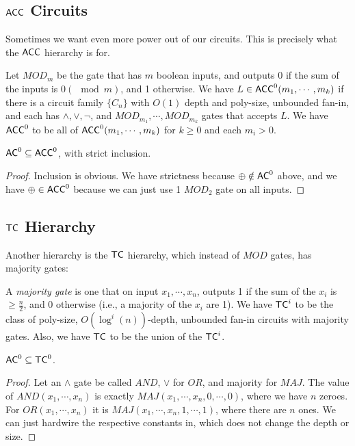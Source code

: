 \subsection{${\mathsf{ACC}}$ Circuits}
Sometimes we want even more power out of our circuits. This is precisely what the ${\mathsf{ACC}}$ hierarchy is for.
\begin{definition}
Let $MOD_m$ be the gate that has $m$ boolean inputs, and outputs 0 if the sum of the inputs is $0 (\mod m)$, and 1 otherwise. We have $L \in {\ensuremath{\mathsf{ACC}}}^0(m_1, \cdots, m_k)$ if there is a circuit family $\{C_n\}$ with $O(1)$ depth and poly-size, unbounded fan-in, and each has $\wedge, \vee, \neg$, and $MOD_{m_1}, \cdots, MOD_{m_k}$ gates that accepts $L$. We have ${\mathsf{ACC}}^0$ to be all of ${\mathsf{ACC}}^0(m_1, \cdots, m_k)$ for $k \ge 0$ and each $m_i > 0$. 
\end{definition}

\begin{theorem}
${\mathsf{AC}}^0 \subseteq {\ensuremath{\mathsf{ACC}}}^0$, with strict inclusion.
\end{theorem}

\begin{proof}
Inclusion is obvious. We have strictness because $\oplus \notin {\ensuremath{\mathsf{AC}}}^0$ above, and we have $\oplus \in {\ensuremath{\mathsf{ACC}}}^0$ because we can just use 1 $MOD_2$ gate on all inputs.
\end{proof}

\subsection{${\mathsf{TC}}$ Hierarchy}
Another hierarchy is the ${\mathsf{TC}}$ hierarchy, which instead of $MOD$ gates, has majority gates:
\begin{definition}
A \emph{majority gate} is one that on input $x_1, \cdots, x_n$, outputs 1 if the sum of the $x_i$ is $\ge \frac{n}{2}$, and 0 otherwise (i.e., a majority of the $x_i$ are 1). We have ${\mathsf{TC}}^i$ to be the class of poly-size, $O(\log^i(n))$-depth, unbounded fan-in circuits with majority gates. Also, we have ${\mathsf{TC}}$ to be the union of the ${\mathsf{TC}}^i$.
\end{definition}

\begin{theorem}
${\mathsf{AC}}^0 \subseteq {\ensuremath{\mathsf{TC}}}^0$.
\end{theorem}
\begin{proof}
Let an $\wedge$ gate be called $AND$, $\vee$ for $OR$, and majority for $MAJ$. The value of $AND(x_1, \cdots, x_n)$ is exactly $MAJ(x_1, \cdots, x_n, 0, \cdots, 0)$, where we have $n$ zeroes. For $OR(x_1, \cdots, x_n)$ it is $MAJ(x_1, \cdots, x_n, 1, \cdots, 1)$, where there are $n$ ones. We can just hardwire the respective constants in, which does not change the depth or size. 
\end{proof}

